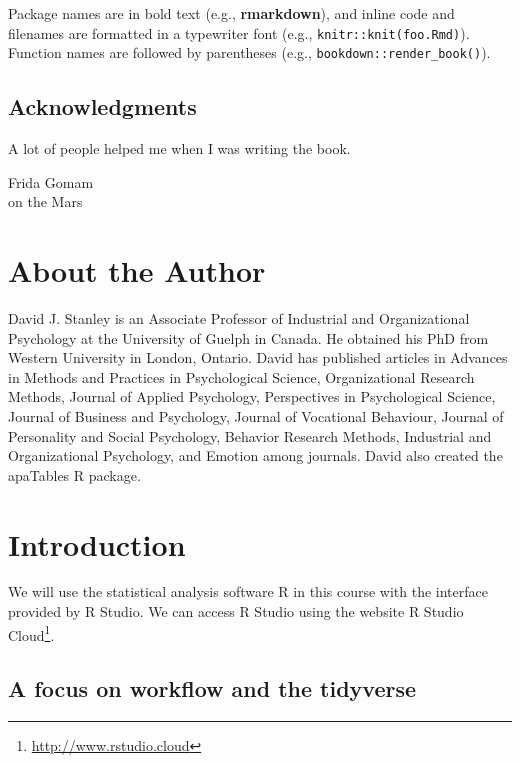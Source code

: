 \documentclass[
]{krantz}
\renewcommand{\href}[2]{#2\footnote{\url{#1}}}
\begin{document}
Package names are in bold text (e.g., \textbf{rmarkdown}), and inline code and filenames are formatted in a typewriter font (e.g., \texttt{knitr::knit(\textquotesingle{}foo.Rmd\textquotesingle{})}). Function names are followed by parentheses (e.g., \texttt{bookdown::render\_book()}).

\hypertarget{acknowledgments}{%
\section*{Acknowledgments}\label{acknowledgments}}


A lot of people helped me when I was writing the book.

\begin{flushright}
Frida Gomam\\
on the Mars
\end{flushright}

\hypertarget{about-the-author}{%
\chapter*{About the Author}\label{about-the-author}}


David J. Stanley is an Associate Professor of Industrial and Organizational Psychology at the University of Guelph in Canada. He obtained his PhD from Western University in London, Ontario. David has published articles in Advances in Methods and Practices in Psychological Science, Organizational Research Methods, Journal of Applied Psychology, Perspectives in Psychological Science, Journal of Business and Psychology, Journal of Vocational Behaviour, Journal of Personality and Social Psychology, Behavior Research Methods, Industrial and Organizational Psychology, and Emotion among journals. David also created the apaTables R package.

\mainmatter

\hypertarget{introduction}{%
\chapter{Introduction}\label{introduction}}

We will use the statistical analysis software R in this course with the interface provided by R Studio. We can access R Studio using the website \href{http://www.rstudio.cloud}{R Studio Cloud}.

\hypertarget{a-focus-on-workflow-and-the-tidyverse}{%
\section{A focus on workflow and the tidyverse}\label{a-focus-on-workflow-and-the-tidyverse}}
\end{document}
